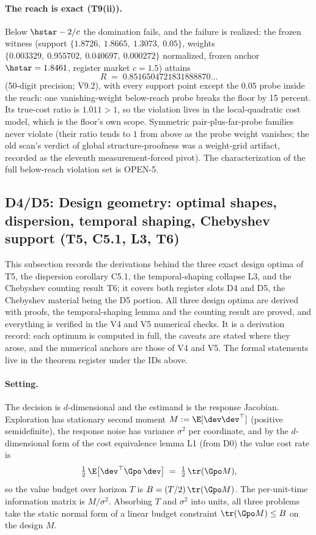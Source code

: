\paragraph{The reach is exact (T9(ii)).}
Below $\hstar-2/c$ the domination fails, and the failure is realized: the
frozen witness (support $\{1.8726,\ 1.8665,\ 1.3073,\ 0.05\}$, weights
$\{0.003329,\ 0.955702,\ 0.040697,\ 0.000272\}$ normalized, frozen anchor
$\hstar=1.8461$, register market $c=1.5$) attains
\begin{equation*}
R \;=\; 0.8516504721831888870\ldots
\end{equation*}
(50-digit precision; V9.2), with every support point except the $0.05$
probe inside the reach: one vanishing-weight below-reach probe breaks the
floor by 15 percent. Its true-cost ratio is $1.011>1$, so the violation
lives in the local-quadratic cost model, which is the floor's own scope.
Symmetric pair-plus-far-probe families never violate (their ratio tends to
$1$ from above as the probe weight vanishes; the old scan's verdict of
global structure-proofness was a weight-grid artifact, recorded as the
eleventh measurement-forced pivot). The characterization of the full
below-reach violation set is OPEN-5.

\subsection*{D4/D5: Design geometry: optimal shapes, dispersion, temporal shaping, Chebyshev support (T5, C5.1, L3, T6)}

This subsection records the derivations behind the three exact design optima
of T5, the dispersion corollary C5.1, the temporal-shaping collapse L3, and
the Chebyshev counting result T6; it covers both register slots D4 and D5,
the Chebyshev material being the D5 portion. All three design optima are
derived with proofs, the temporal-shaping lemma and the counting result are
proved, and everything is verified in the V4 and V5 numerical checks. It is
a derivation record: each optimum is computed in full, the caveats are
stated where they arose, and the numerical anchors are those of V4 and V5.
The formal statements live in the theorem register under the IDs above.

\paragraph{Setting.}
The decision is $d$-dimensional and the estimand is the response Jacobian.
Exploration has stationary second moment $M := \E[\dev\dev^\top]$ (positive
semidefinite), the response noise has variance $\sigma^2$ per coordinate,
and by the $d$-dimensional form of the cost equivalence lemma L1 (from D0)
the value cost rate is
\begin{equation*}
\tfrac{1}{2}\,\E\big[\dev^\top \Gpo\, \dev\big]
\;=\; \tfrac{1}{2}\,\tr(\Gpo M),
\end{equation*}
so the value budget over horizon $T$ is $B = (T/2)\,\tr(\Gpo M)$. The
per-unit-time information matrix is $M/\sigma^2$. Absorbing $T$ and
$\sigma^2$ into units, all three problems take the static normal form of a
linear budget constraint $\tr(\Gpo M) \le B$ on the design $M$.

